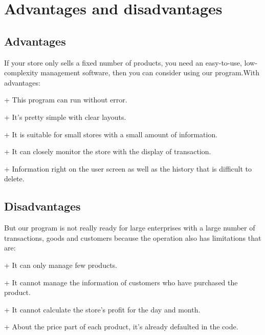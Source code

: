 \newpage
\section{Advantages and disadvantages}

\subsection{Advantages}
If your store only sells a fixed number of products, you need an easy-to-use, low-complexity management software, then you can consider using our program.With advantages:
 \item + This program can run without error.
 \item + It's pretty simple with clear layouts.
 \item + It is suitable for small stores with a small amount of information.
 \item + It can closely monitor the store with the display of transaction.
 \item + Information right on the user screen as well as the history that is difficult to delete.
 

\subsection{Disadvantages}

\hspace{0.7cm}
But our program is not really ready for large enterprises with a large number of transactions, goods and customers because the operation also has limitations that are:
\item + It can only manage few products.
\item + It cannot manage the information of customers who have purchased the product.
\item + It cannot calculate the store's profit for the day and month.
\item + About the price part of each product, it's already defaulted in the code.